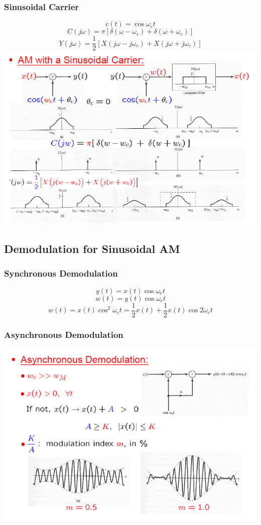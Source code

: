 \documentclass[landscape,a4paper]{article}
\begin{document}
\begin{multicols}{3}
\subsubsection{Sinusoidal Carrier}
$$c(t)=\cos\omega_ct$$
$$C(j\omega)=\pi[\delta(\omega-\omega_c)+\delta(\omega+\omega_c)]$$
$$Y(j\omega)=\frac{1}{2}[X(j\omega-j\omega_c)+X(j\omega+j\omega_c)]$$
\includegraphics[width=\linewidth]{8.1.2.png}

\subsection{Demodulation for Sinusoidal AM}

\subsubsection{Synchronous Demodulation}
$$y(t)=x(t)\cos\omega_ct$$
$$w(t)=y(t)\cos\omega_ct$$
$$w(t)=x(t)\cos^2\omega_ct=\frac{1}{2}x(t)+\frac{1}{2}x(t)\cos2\omega_ct$$

\subsubsection{Asynchronous Demodulation}
\includegraphics[width=\linewidth]{8.2.2.png}


\end{multicols}
\end{document}

